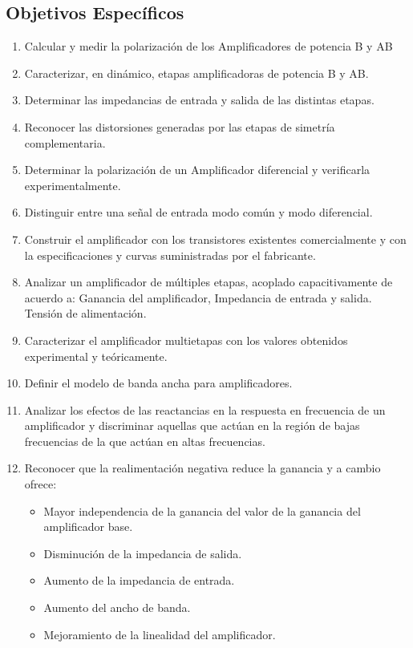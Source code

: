 \subsection{Objetivos Específicos}
\begin{enumerate}
    \item Calcular y medir la polarización de los Amplificadores de potencia B y AB
    \item Caracterizar, en dinámico, etapas amplificadoras de potencia B y AB.
    \item Determinar las impedancias de entrada y salida de las distintas etapas.
    \item Reconocer las distorsiones generadas por las etapas de simetría complementaria. 
    \item Determinar la polarización de un Amplificador diferencial y verificarla experimentalmente.
    \item Distinguir entre una señal de entrada modo común y modo diferencial.
    \item Construir el amplificador con los transistores existentes comercialmente y con la especificaciones y curvas suministradas por el fabricante.
    \item Analizar un amplificador de múltiples etapas, acoplado capacitivamente de acuerdo a: Ganancia del amplificador, Impedancia de entrada y salida. Tensión de alimentación.
    \item Caracterizar el amplificador multietapas con los valores obtenidos experimental y teóricamente.
    \item Definir el modelo de banda ancha para amplificadores.
    \item Analizar los efectos de las reactancias en la respuesta en frecuencia de un amplificador y discriminar aquellas que actúan en la región de bajas frecuencias de la que actúan en altas frecuencias.
    \item Reconocer que la realimentación negativa reduce la ganancia y a cambio ofrece:
    \begin{itemize}
        \item Mayor independencia de la ganancia del valor de la ganancia del amplificador base.
        \item Disminución de la impedancia de salida.
        \item Aumento de la impedancia de entrada.
        \item Aumento del ancho de banda.
        \item Mejoramiento de la linealidad del amplificador.
    \end{itemize}
\end{enumerate}

\newpage